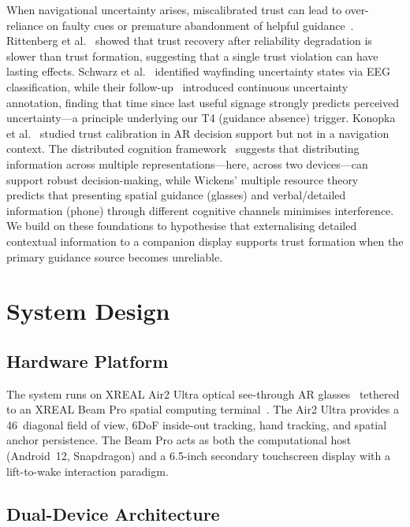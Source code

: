 \documentclass[review]{vgtc}           %
\begin{document}
When navigational uncertainty arises, miscalibrated trust can lead to
over-reliance on faulty cues or premature abandonment of helpful
guidance~\cite{LeeMoray:1992:TCA, Parasuraman:2010:CAB}. Rittenberg
et al.~\cite{Rittenberg:2024:TID} showed that trust recovery after
reliability degradation is slower than trust formation, suggesting
that a single trust violation can have lasting effects. Schwarz et
al.~\cite{Schwarz:2022:IUS} identified wayfinding uncertainty states
via EEG classification, while their follow-up~\cite{Schwarz:2023:RCP}
introduced continuous uncertainty annotation, finding that time since
last useful signage strongly predicts perceived uncertainty---a
principle underlying our T4 (guidance absence) trigger. Konopka et
al.~\cite{Konopka:2024:TCA} studied trust calibration in AR decision
support but not in a navigation context. The distributed cognition
framework~\cite{Hutchins:1995:CIW, Hollan:2000:DCT} suggests that
distributing information across multiple representations---here,
across two devices---can support robust decision-making, while Wickens'
multiple resource theory~\cite{Wickens:2002:MRP} predicts that
presenting spatial guidance (glasses) and verbal/detailed information
(phone) through different cognitive channels minimises interference.
We build on these foundations to hypothesise that externalising
detailed contextual information to a companion display supports
trust formation when the primary guidance source becomes unreliable.



\section{System Design}

\subsection{Hardware Platform}

The system runs on XREAL Air2 Ultra optical see-through AR
glasses~\cite{XREAL:2024:A2U} tethered to an XREAL Beam Pro spatial
computing terminal~\cite{XREAL:2024:BPR}. The Air2 Ultra provides a
46\textdegree\ diagonal field of view, 6DoF inside-out tracking, hand
tracking, and spatial anchor persistence. The Beam Pro acts as both
the computational host (Android~12, Snapdragon) and a 6.5-inch
secondary touchscreen display with a lift-to-wake interaction paradigm.

\subsection{Dual-Device Architecture}
\end{document}
